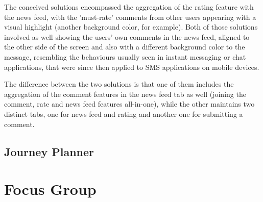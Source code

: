 The conceived solutions encompassed the aggregation of the rating feature with the news feed, with the 'must-rate' comments from other users appearing with a visual highlight (another background color, for example).
Both of those solutions involved as well showing the users' own comments in the news feed, aligned to the other side of the screen and also with a different background color to the message, resembling the behaviours usually seen in instant messaging or chat applications, that were since then applied to SMS applications on mobile devices.

The difference between the two solutions is that one of them includes the aggregation of the comment features in the news feed tab as well (joining the comment, rate and news feed features all-in-one), while the other maintains two distinct tabs, one for news feed and rating and another one for submitting a comment.

\subsection{Journey Planner}



\clearpage
\section{Focus Group}\label{focusgroup}
